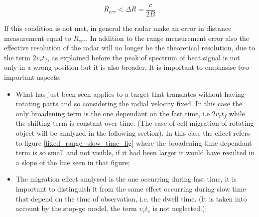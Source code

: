 \begin{equation}
    R_{err} < \Delta R = \frac{c}{2 B}
    \label{stopgo_condition}
\end{equation}

If this condition is not met, in general the radar make an error in distance measurement equal to $R_{err}$. In addition to the range measurement error also the effective resolution of the radar will no longer be the theoretical resolution, due to the term $2 v_r t_f$, as explained before the peak of spectrum of beat signal is not only in a wrong position but it is also broader.
It is important to emphasise two important aspects:
\begin{itemize}
     \item What has just been seen applies to a target that translates without having rotating parts and so considering the radial velocity fixed. In this case the only broadening term is the one dependant on the fast time, i.e $2 v_r t_f$ while the shifting term is constant over time. (The case of cell migration of rotating object will be analyzed in the following section). In this case the effect refers to figure \ref{fixed_range_slow_time_fig} where the broadening time dependant term is so small and not visible, if it had been larger it would have resulted in a slope of the line seen in that figure;
         
    \item The migration effect analysed is the one occurring during fast time, it is important to distinguish it from the same effect occurring during slow time that depend on the time of observation, i.e. the dwell time. (It is taken into account by the stop-go model, the term $v_{r}t_{s}$ is not neglected.);

\end{itemize}

